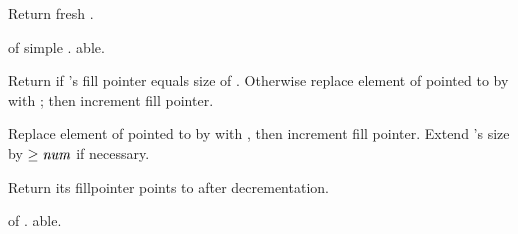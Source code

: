 \begin{LIST}{1cm}
  
  {
  Return fresh .
  }

  {
     of simple . able.
  }

  {
  Return \retval{\NIL} if 's fill pointer equals size of
  . Otherwise replace element of  pointed to
  by  with ; then increment fill
  pointer. 
  }

  {
  Replace element of  pointed to by  with
  , then increment fill pointer. Extend 's size by
  $\ge \VAR{num}$ if necessary.
  }

  {
  Return  its fillpointer points to
  after decrementation.
  }

  {
   of . able.
  }

\end{LIST}



